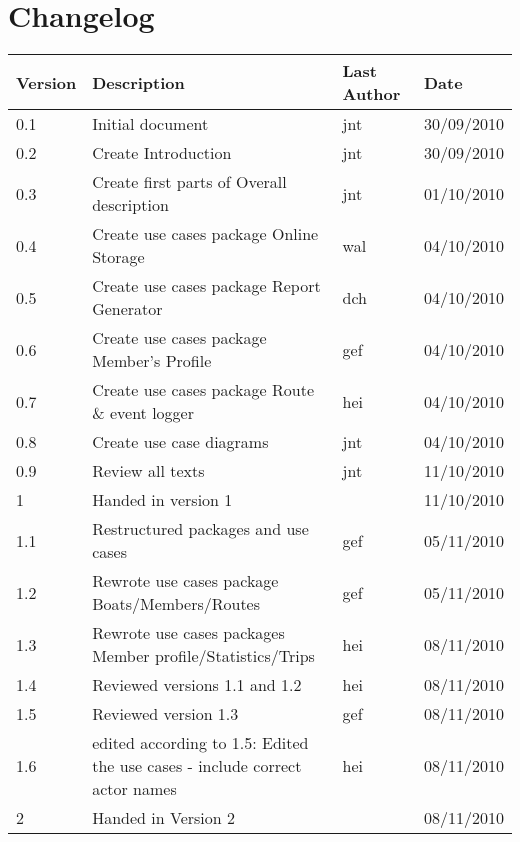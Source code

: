 \section*{Changelog}

\begin{table}[h!]
	\begin{center}
		\begin{tabular}{|l|l|l|l|}
			\hline
			\rowcolor{fontys_pink_light}Version	&Description	&Last Author	&Date\\
			\hline
			0.1	&Initial document	&jnt	&30/09/2010\\
			\hline
			0.2	&Create Introduction	&jnt	&30/09/2010\\
			\hline
			0.3	&Create first parts of Overall description	&jnt	&01/10/2010\\
			\hline
			0.4	&Create use cases package Online Storage&wal	&04/10/2010\\
			\hline
			0.5	&Create use cases package Report Generator	&dch	&04/10/2010\\
			\hline
			0.6	&Create use cases package Member's Profile	&gef	&04/10/2010\\
			\hline
			0.7	&Create use cases package Route \& event logger	&hei	&04/10/2010\\
			\hline
			0.8	&Create use case diagrams	&jnt	&04/10/2010\\
			\hline
			0.9	&Review all texts	&jnt	&11/10/2010\\
			\hline
			\rowcolor{fontysgreen2}1	& Handed in version 1 & &11/10/2010\\
			\hline
			1.1	&Restructured packages and use cases	&gef	&05/11/2010\\
			\hline
			1.2	&Rewrote use cases package Boats/Members/Routes	&gef	&05/11/2010\\
			\hline
			1.3	&Rewrote use cases packages Member profile/Statistics/Trips 	&hei	&08/11/2010\\
			\hline
			1.4	&Reviewed versions 1.1 and 1.2  &hei	&08/11/2010\\
			\hline
			1.5	&Reviewed version 1.3  &gef	&08/11/2010\\
			\hline
			1.6	&edited according to 1.5: Edited the use cases - include correct actor names  &hei	&08/11/2010\\
			\hline
			\rowcolor{fontysgreen2}2	&Handed in Version 2  &	&08/11/2010\\

		\hline
		\end{tabular}
	\end{center}
	\label{tab:changelog}
\end{table}

